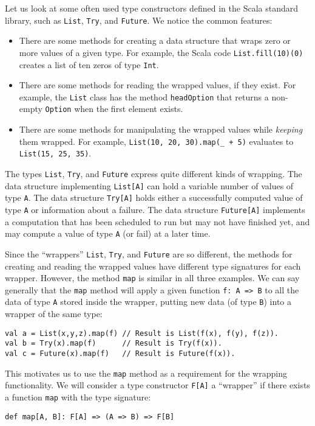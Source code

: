 Let us look at some often used type constructors defined in the Scala
standard library, such as \lstinline!List!, \lstinline!Try!, and
\lstinline!Future!. We notice the common features:
\begin{itemize}
\item There are some methods for creating a data structure that wraps zero
or more values of a given type. For example, the Scala code \lstinline!List.fill(10)(0)!
creates a list of ten zeros of type \lstinline!Int!.
\item There are some methods for reading the wrapped values, if they exist.
For example, the \lstinline!List! class has the method \lstinline!headOption!
that returns a non-empty \lstinline!Option! when the first element
exists.
\item There are some methods for manipulating the wrapped values while \emph{keeping}
them wrapped. For example, \lstinline!List(10, 20, 30).map(_ + 5)!
evaluates to \lstinline!List(15, 25, 35)!.
\end{itemize}
The types \lstinline!List!, \lstinline!Try!, and \lstinline!Future!
express quite different kinds of wrapping. The data structure implementing
\lstinline!List[A]! can hold a variable number of values of type
\lstinline!A!. The data structure \lstinline!Try[A]! holds either
a successfully computed value of type \lstinline!A! or information
about a failure. The data structure \lstinline!Future[A]! implements
a computation that has been scheduled to run but may not have finished
yet, and may compute a value of type \lstinline!A! (or fail) at a
later time.

Since the \textsf{``}wrappers\textsf{''} \lstinline!List!, \lstinline!Try!, and
\lstinline!Future! are so different, the methods for creating and
reading the wrapped values have different type signatures for each
wrapper. However, the method \lstinline!map! is similar in all three
examples. We can say generally that the \lstinline!map! method will
apply a given function \lstinline!f: A => B! to all the data of type
\lstinline!A! stored inside the wrapper, putting new data (of type
\lstinline!B!) into a wrapper of the same type:
\begin{lstlisting}
val a = List(x,y,z).map(f) // Result is List(f(x), f(y), f(z)).
val b = Try(x).map(f)      // Result is Try(f(x)).
val c = Future(x).map(f)   // Result is Future(f(x)).
\end{lstlisting}
This motivates us to use the \lstinline!map! method as a requirement
for the wrapping functionality. We will consider a type constructor
\lstinline!F[A]! a \textsf{``}wrapper\textsf{''} if there exists a function \lstinline!map!
with the type signature:
\begin{lstlisting}
def map[A, B]: F[A] => (A => B) => F[B]
\end{lstlisting}

